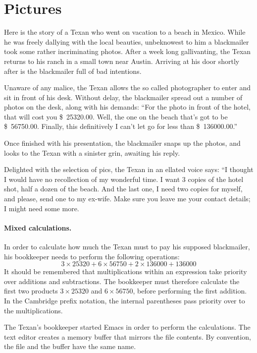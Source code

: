 \documentclass[a4paper,12pt]{book}
\begin{document}
\section{Pictures}
Here is the story of a Texan who went on
vacation to a beach in Mexico. While he was
freely dallying with the local beauties,
unbeknowest to him a blackmailer took some
rather incriminating photos.
After a week long gallivanting, the Texan
returns to his ranch in a small town near Austin.
Arriving at his door shortly after is the blackmailer
full of bad intentions.

Unaware of any malice, the Texan allows the so
called photographer to enter and sit in front
of his desk. Without delay, the blackmailer spread
out a number of photos on the desk, along with his
demands: “For the photo in front of the hotel,
that will cost you \$~25320.00. Well, the one
on the beach that's got to be \$~56750.00.
Finally, this definitively I can't let
go for less than \$~136000.00.”

Once finished with his presentation,
the blackmailer snaps up the photos,
and looks to the Texan with a sinister
grin, awaiting his reply.

Delighted with the selection of pics,
the Texan in an ellated voice says:
“I thought I would have no recollection
of my wonderful time. I want 3 copies
of the hotel shot, half a dozen of the beach.
And the last one, I need two copies for myself,
and please, send one to my ex-wife.
Make sure you leave me your contact
details; I might need some more.

\paragraph{Mixed calculations.}
In order to calculate how much the
Texan must to pay his supposed blackmailer,
his bookkeeper needs to perform the
following operations:
$$3\times 25320+6\times 56750 + 2\times 136000+136000$$
It should be remembered that multiplications
within an expression take priority over additions
and subtractions. The bookkeeper must therefore
calculate the first two products $3\times 25320$
and $6\times 56750$, before performing the first
addition. In the Cambridge prefix notation,
the internal parentheses pass priority over
to the multiplications.

The Texan's bookkeeper started Emacs
in order to perform the calculations.
The text editor creates a memory
buffer that mirrors the file contents.
By convention, the file and the buffer
have the same name.
\end{document}
